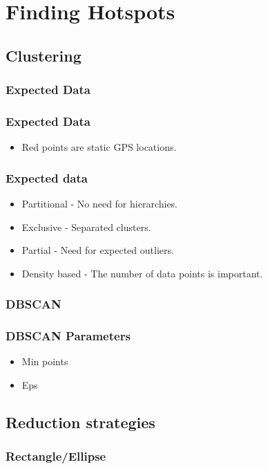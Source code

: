 \section{Finding Hotspots}

\subsection{Clustering}
\subsubsection{Expected Data}
\begin{frame}
\frametitle{Expected Data}
	\begin{itemize}
		\item Red points are static GPS locations.
	\end{itemize}
	
\end{frame}	
\begin{frame}
\frametitle{Expected data}
	\begin{itemize}
		\item Partitional - No need for hierarchies.
		\item Exclusive - Separated clusters.
		\item Partial - Need for expected outliers.
		\item Density based - The number of data points is important.
	\end{itemize}
	
\end{frame}	
\subsubsection{DBSCAN} %
\begin{frame}
\frametitle{DBSCAN Parameters}
	\begin{itemize}
		\item Min points
		\item Eps
	\end{itemize}
\end{frame}	


\subsection{Reduction strategies}
\subsubsection{Rectangle/Ellipse}
